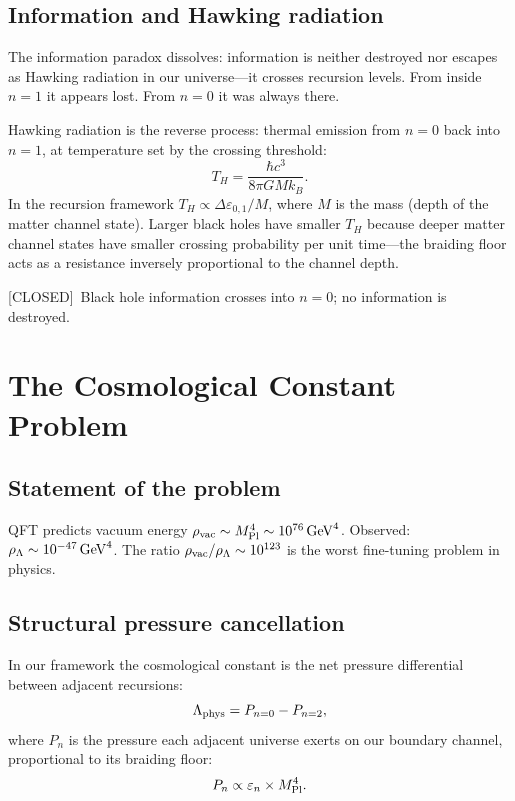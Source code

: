 \documentclass[prd,twocolumn,preprintnumbers,amsmath,amssymb]{revtex4-2}
\newcommand{\closed}{\textcolor{green!60!black}{[CLOSED]}}
\begin{document}
\subsection{Information and Hawking radiation}

The information paradox dissolves: information is neither destroyed
nor escapes as Hawking radiation in our universe---it crosses
recursion levels.  From inside $n=1$ it appears lost.  From $n=0$
it was always there.

Hawking radiation is the reverse process: thermal emission from $n=0$
back into $n=1$, at temperature set by the crossing threshold:
\begin{equation}
  T_H = \frac{\hbar c^3}{8\pi G M k_B}.
  \label{eq:TH}
\end{equation}
In the recursion framework $T_H \propto \Delta\varepsilon_{0,1}/M$,
where $M$ is the mass (depth of the matter channel state).  Larger
black holes have smaller $T_H$ because deeper matter channel states
have smaller crossing probability per unit time---the braiding floor
acts as a resistance inversely proportional to the channel depth.

\closed\ Black hole information crosses into $n=0$; no information
is destroyed.

\section{The Cosmological Constant Problem}
\label{sec:cosmoconst}

\subsection{Statement of the problem}

QFT predicts vacuum energy
$\rho_{\rm vac} \sim M_{\rm Pl}^4 \sim 10^{76}\,{\rm GeV}^4$.
Observed: $\rho_\Lambda \sim 10^{-47}\,{\rm GeV}^4$.  The ratio
$\rho_{\rm vac}/\rho_\Lambda \sim 10^{123}$ is the worst fine-tuning
problem in physics.

\subsection{Structural pressure cancellation}

In our framework the cosmological constant is the net pressure
differential between adjacent recursions:
\begin{equation}
  \Lambda_{\rm phys} = P_{n=0} - P_{n=2},
  \label{eq:Lambda}
\end{equation}
where $P_n$ is the pressure each adjacent universe exerts on our
boundary channel, proportional to its braiding floor:
\begin{equation}
  P_n \propto \varepsilon_n \times M_{\rm Pl}^4.
  \label{eq:Pn}
\end{equation}
\end{document}
